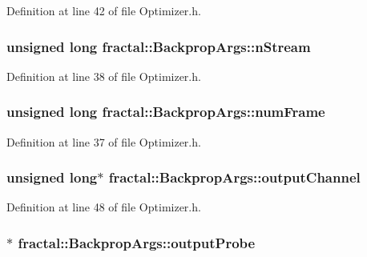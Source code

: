 Definition at line 42 of file Optimizer.\+h.

\hypertarget{classfractal_1_1BackpropArgs_a3c715a926b61b851683280a0fd14c6b8}{
\subsubsection[{n\+Stream}]{\setlength{\rightskip}{0pt plus 5cm}unsigned long fractal\+::\+Backprop\+Args\+::n\+Stream}}\label{classfractal_1_1BackpropArgs_a3c715a926b61b851683280a0fd14c6b8}


Definition at line 38 of file Optimizer.\+h.

\hypertarget{classfractal_1_1BackpropArgs_ad9048cb8bd18097e49b46ab0bd7e7a76}{
\subsubsection[{num\+Frame}]{\setlength{\rightskip}{0pt plus 5cm}unsigned long fractal\+::\+Backprop\+Args\+::num\+Frame}}\label{classfractal_1_1BackpropArgs_ad9048cb8bd18097e49b46ab0bd7e7a76}


Definition at line 37 of file Optimizer.\+h.

\hypertarget{classfractal_1_1BackpropArgs_aba9fc480f23686a563ceae2889660c23}{
\subsubsection[{output\+Channel}]{\setlength{\rightskip}{0pt plus 5cm}unsigned long$\ast$ fractal\+::\+Backprop\+Args\+::output\+Channel}}\label{classfractal_1_1BackpropArgs_aba9fc480f23686a563ceae2889660c23}


Definition at line 48 of file Optimizer.\+h.

\hypertarget{classfractal_1_1BackpropArgs_ae073c7cdaf8f81c9b634ce52e1bcf69a}{
\subsubsection[{output\+Probe}]{$\ast$ fractal\+::\+Backprop\+Args\+::output\+Probe}}\label{classfractal_1_1BackpropArgs_ae073c7cdaf8f81c9b634ce52e1bcf69a}


